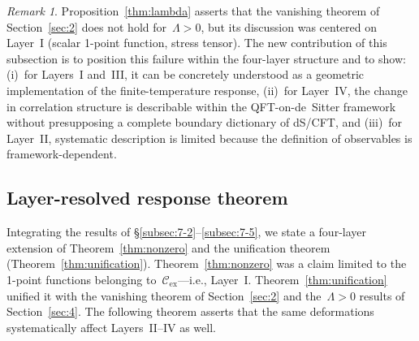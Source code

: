\documentclass[
  aps,
  prd,
  preprint,
  groupedaddress,
  nofootinbib,
  longbibliography
]{revtex4-2}
\theoremstyle{remark}
\newtheorem{remark}[definition]{Remark}
\newcommand{\Cex}{\mathcal{C}_{\mathrm{ex}}}
\begin{document}
\begin{remark}\label{rem:Lambda-layers-new}
Proposition~\ref{thm:lambda} asserts that the vanishing theorem of
Section~\ref{sec:2} does not hold for~$\Lambda>0$, but its
discussion was centered on Layer~I (scalar 1-point function,
stress tensor).
The new contribution of this subsection is to position this
failure within the four-layer structure and to show:
(i)~for Layers~I and~III, it can be concretely understood as a
geometric implementation of the finite-temperature response,
(ii)~for Layer~IV, the change in correlation structure is
describable within the QFT-on-de~Sitter framework without
presupposing a complete boundary dictionary of dS/CFT, and
(iii)~for Layer~II, systematic description is limited because
the definition of observables is framework-dependent.
\end{remark}

\subsection{Layer-resolved response theorem}\label{subsec:7-6}

Integrating the results of \S\ref{subsec:7-2}--\ref{subsec:7-5},
we state a four-layer extension of
Theorem~\ref{thm:nonzero} and the unification theorem
(Theorem~\ref{thm:unification}).
Theorem~\ref{thm:nonzero} was a claim limited to the 1-point
functions belonging to~$\Cex$---i.e., Layer~I\@.
Theorem~\ref{thm:unification} unified it with the vanishing
theorem of Section~\ref{sec:2} and the~$\Lambda>0$ results of
Section~\ref{sec:4}.
The following theorem asserts that the same deformations
systematically affect Layers~II--IV as well.
\end{document}
